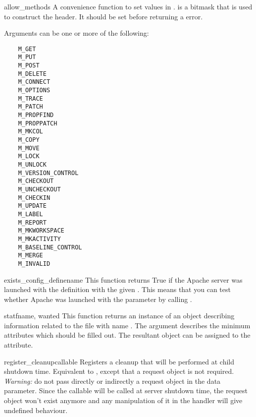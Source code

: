 \begin{funcdesc}{allow_methods}{}
  A convenience function to set values in .
   is a bitmask that is used to construct the
   header. It should be set before returning a
   error.

  Arguments can be one or more of the following:
  \begin{verbatim}
    M_GET
    M_PUT
    M_POST
    M_DELETE
    M_CONNECT
    M_OPTIONS
    M_TRACE
    M_PATCH
    M_PROPFIND
    M_PROPPATCH
    M_MKCOL
    M_COPY
    M_MOVE
    M_LOCK
    M_UNLOCK
    M_VERSION_CONTROL
    M_CHECKOUT
    M_UNCHECKOUT
    M_CHECKIN
    M_UPDATE
    M_LABEL
    M_REPORT
    M_MKWORKSPACE
    M_MKACTIVITY
    M_BASELINE_CONTROL
    M_MERGE
    M_INVALID
  \end{verbatim}

\end{funcdesc}

\begin{funcdesc}{exists_config_define}{name}
    This function returns True if the Apache server was launched
    with the definition with the given . This means
    that you can test whether Apache was launched with the 
    parameter by calling .
\end{funcdesc}

\begin{funcdesc}{stat}{fname, wanted}
    This function returns an instance of an  object
    describing information related to the file with name .
    The  argument describes the minimum attributes which
    should be filled out. The resultant object can be assigned to the
     attribute.
\end{funcdesc}

\begin{funcdesc}{register_cleanup}{callable}
  Registers a cleanup that will be performed at child shutdown time. Equivalent
  to , except that a request object is not
  required.
  \emph{Warning:} do not pass directly or indirectly a request object in the
  data parameter. Since the callable will be called at server shutdown time,
  the request object won't exist anymore and any manipulation of it in the
  handler will give undefined behaviour.
\end{funcdesc}

